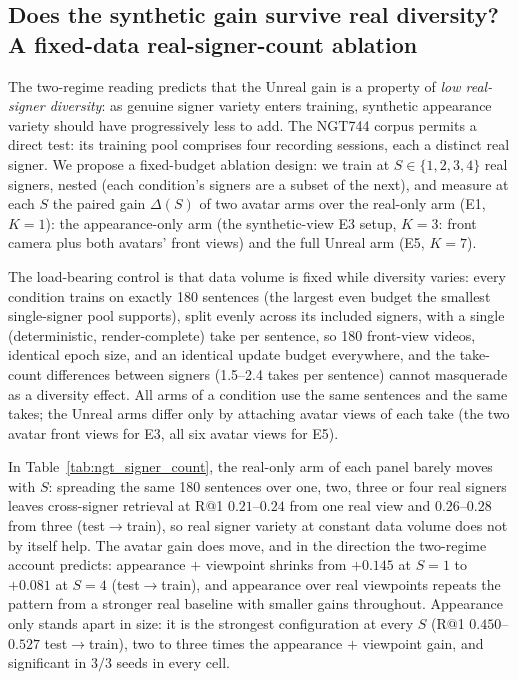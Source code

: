 \subsection{Does the synthetic gain survive real diversity? A fixed-data
real-signer-count ablation}
\label{sec:ngt-signer-count}
The two-regime reading predicts that the Unreal gain is a property of
\emph{low real-signer diversity}: as genuine signer variety enters
training, synthetic appearance variety should have progressively less to
add. The NGT744 corpus permits a direct test: its training pool comprises
four recording sessions, each a distinct real signer. We propose a
fixed-budget ablation design: we train at
$S \in \{1,2,3,4\}$ real signers, nested (each condition's signers are a
subset of the next), and measure at each $S$ the paired gain
$\Delta(S)$ of two avatar arms over the real-only arm (E1, $K{=}1$): the
appearance-only arm (the synthetic-view E3 setup, $K{=}3$: front camera plus
both avatars' front views) and the full Unreal arm (E5, $K{=}7$).

The load-bearing control is that data volume is fixed while diversity
varies: every condition trains on exactly 180 sentences (the largest even
budget the smallest single-signer pool supports), split evenly across its included signers, with a
single (deterministic, render-complete)
take per sentence, so 180 front-view videos, identical epoch size, and
an identical update budget everywhere, and the take-count differences
between signers (1.5--2.4 takes per sentence) cannot masquerade as a
diversity effect. All arms of a condition use the same sentences and the
same takes; the Unreal arms differ only by attaching avatar views of each
take (the two avatar front views for E3, all six avatar views for E5).


In Table~\ref{tab:ngt_signer_count}, the
real-only arm of each panel barely moves with $S$: spreading the same 180
sentences over one, two, three or four real signers leaves cross-signer
retrieval at R@1 $0.21$--$0.24$ from one real view and $0.26$--$0.28$ from
three (test$\to$train), so real signer variety at constant data volume
does not by itself help. The avatar gain does move, and in the
direction the two-regime account predicts: appearance $+$ viewpoint
shrinks from $+0.145$ at $S{=}1$ to $+0.081$ at $S{=}4$ (test$\to$train),
and appearance over real viewpoints repeats the pattern from a stronger
real baseline with smaller gains throughout. Appearance only stands apart
in size: it is the strongest configuration at every $S$ (R@1
$0.450$--$0.527$ test$\to$train), two to three times the appearance $+$
viewpoint gain, and significant in $3/3$ seeds in every cell.

